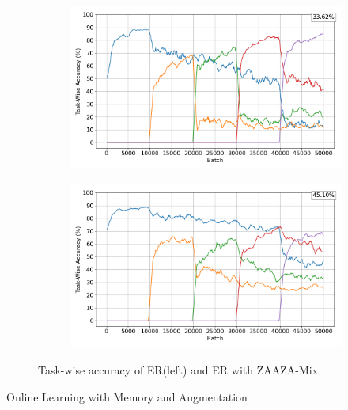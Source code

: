 \documentclass[oneside]{ctuthesis}
\begin{document}
\begin{figure}[t]
    \centering
    \begin{subfigure}[t]{0.48\linewidth}
        \centering
        \includegraphics[width=\linewidth]{figures/CIFAR10_DISJOINT_RESERVOIR_BASE_accuracy.png}
    \end{subfigure}
    \hfill
    \begin{subfigure}[t]{0.48\linewidth}
        \centering
        \includegraphics[width=\linewidth]{figures/CIFAR10_DISJOINT_ZAAZA_accuracy.png}
    \end{subfigure}

    \caption{Task-wise accuracy of ER(left) and ER with ZAAZA-Mix}
    \label{fig:er-zaaza}
\end{figure}



\begin{algorithm}[t]
\label{alg:ZAAZA-Mix}
\SetAlgoLined
{}

\caption{Online Learning with Memory and Augmentation}
\end{algorithm}
\end{document}
